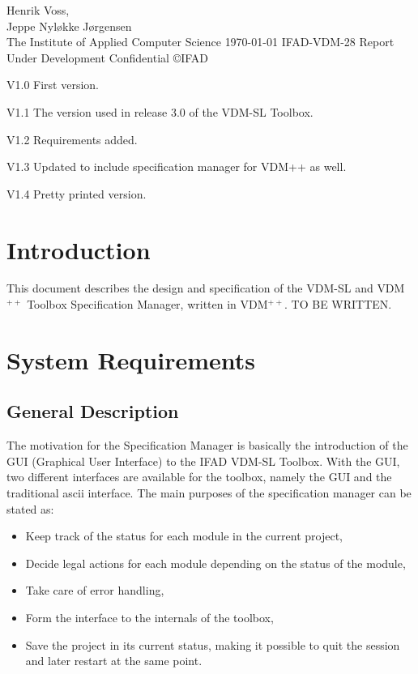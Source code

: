 \documentclass[11pt]{article}
\newcommand{\TBW}{TO BE WRITTEN}
\newcommand{\vdmpp}{{\small VDM}$^{++}$\/}
\newcommand{\vdmsl}{\small VDM-SL\/}
\newcommand{\specman} {Specification Manager}
\begin{document}

{Henrik Voss,\\
 Jeppe Nyl\o{}kke J\o{}rgensen \\
  The Institute of Applied Computer Science}
{\today}
{IFAD-VDM-28}
{Report}
{Under Development}
{Confidential}
{\copyright IFAD}
{\item[V1.0] First version.
 \item[V1.1] The version used in release 3.0 of the VDM-SL Toolbox.
 \item[V1.2] Requirements added.
 \item[V1.3] Updated to include specification manager for VDM++ as
   well.
 \item[V1.4] Pretty printed version.
 \item[\mbox{}] \mbox{}}
{\mbox{}}

\tableofcontents
\newpage
\renewcommand{\thepage}{\arabic{page}}
\setcounter{page}{1}

\parskip12pt
\parindent0pt
     
\section{Introduction}


This document describes the design and specification of the \vdmsl{}
and \vdmpp{} Toolbox Specification Manager, written in \vdmpp{}.
\TBW{}.

\section{System Requirements}
\label{sec:req}

\subsection{General Description}
\label{sec:reqtext}

The motivation for the \specman{} is basically the introduction of the
GUI (Graphical User Interface) to the IFAD \vdmsl{} Toolbox. With the
GUI, two different interfaces are available for the toolbox, namely
the GUI and the traditional ascii interface. The main purposes of the
specification manager can be stated as:
\begin{itemize}
\item Keep track of the status for each module in the current project,
\item Decide legal actions for each module depending on the status of
  the module, 
\item Take care of error handling,
\item Form the interface to the internals of the toolbox,
\item Save the project in its current status, making it possible to
  quit the session and later restart at the same point.
\end{itemize}
\end{document}
